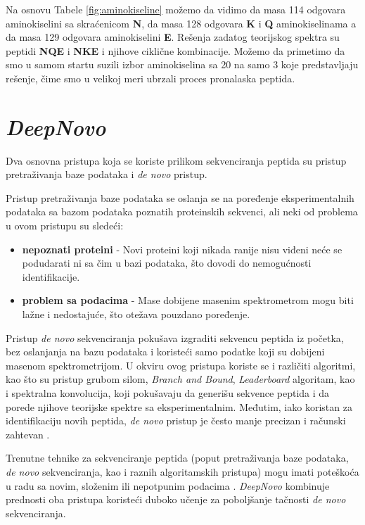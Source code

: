 \documentclass[12pt,oneside]{memoir}
\begin{document}
Na osnovu Tabele \ref{fig:aminokiseline} možemo da vidimo da masa 114 odgovara aminokiselini sa skraćenicom \textbf{N}, da masa 128 odgovara \textbf{K} i \textbf{Q} aminokiselinama a da masa 129 odgovara aminokiselini \textbf{E}.
Rešenja zadatog teorijskog spektra su peptidi \textbf{NQE} i \textbf{NKE} i njihove ciklične kombinacije. Možemo da primetimo da smo u samom startu suzili izbor aminokiselina sa 20 na samo 3 koje predstavljaju rešenje, čime smo u velikoj meri ubrzali proces pronalaska peptida.

\section{\emph{DeepNovo}}

Dva osnovna pristupa koja se koriste prilikom sekvenciranja peptida su pristup pretraživanja baze podataka i \textit{de novo} pristup.

Pristup pretraživanja baze podataka se oslanja se na poređenje eksperimentalnih podataka sa bazom podataka poznatih proteinskih sekvenci, ali neki od problema u ovom pristupu su sledeći:

\begin{itemize}
    \item \textbf{nepoznati proteini} - Novi proteini koji nikada ranije nisu viđeni neće se podudarati ni sa čim u bazi podataka, što dovodi do nemogućnosti identifikacije.
    \item \textbf{problem sa podacima} - Mase dobijene masenim spektrometrom mogu biti lažne i nedostajuće, što otežava pouzdano poređenje.
\end{itemize}

Pristup \emph{de novo} sekvenciranja pokušava izgraditi sekvencu peptida iz početka, bez oslanjanja na bazu podataka i koristeći samo podatke koji su dobijeni masenom spektrometrijom. U okviru ovog pristupa koriste se i različiti algoritmi, kao što su pristup grubom silom, \emph{Branch and Bound}, \emph{Leaderboard} algoritam, kao i spektralna konvolucija, koji pokušavaju da generišu sekvence peptida i da porede njihove teorijske spektre sa eksperimentalnim. Međutim, iako koristan za identifikaciju novih peptida, \emph{de novo} pristup je često manje precizan i računski zahtevan \cite{deepnovo}. 

Trenutne tehnike za sekvenciranje peptida (poput pretraživanja baze podataka, \emph{de novo} sekvenciranja, kao i raznih algoritamskih pristupa) mogu imati poteškoća u radu sa novim, složenim ili nepotpunim podacima \cite{deepnovo}. \emph{DeepNovo} kombinuje prednosti oba pristupa koristeći duboko učenje za poboljšanje tačnosti \emph{de novo} sekvenciranja.
\end{document}
